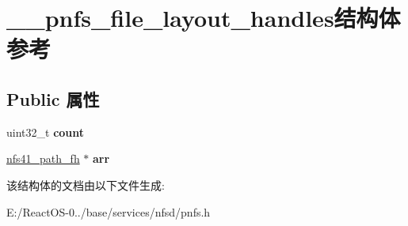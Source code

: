 \hypertarget{struct____pnfs__file__layout__handles}{}\section{\+\_\+\+\_\+pnfs\+\_\+file\+\_\+layout\+\_\+handles结构体 参考}
\label{struct____pnfs__file__layout__handles}
\subsection*{Public 属性}
\begin{DoxyCompactItemize}
\item 
\mbox{\label{struct____pnfs__file__layout__handles_a8daf09de416de0b08d00cde5427dffd3}} 
uint32\+\_\+t {\bfseries count}
\item 
\mbox{\label{struct____pnfs__file__layout__handles_a45f29d3e935007280fb7943e50298c2f}} 
\hyperlink{struct____nfs41__path__fh}{nfs41\+\_\+path\+\_\+fh} $\ast$ {\bfseries arr}
\end{DoxyCompactItemize}


该结构体的文档由以下文件生成\+:\begin{DoxyCompactItemize}
\item 
E\+:/\+React\+O\+S-\/0../base/services/nfsd/pnfs.\+h\end{DoxyCompactItemize}
